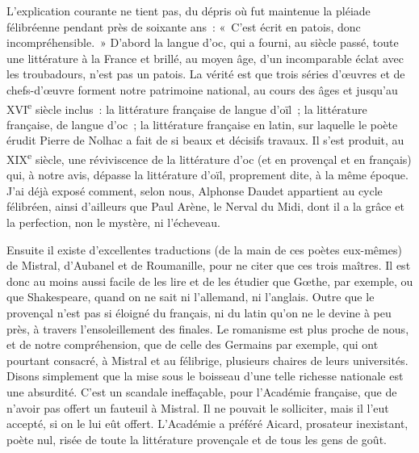 \documentclass[french,twoside]{book} %
\begin{document}
L’explication courante ne tient pas, du dépris où fut maintenue la pléiade félibréenne pendant près de soixante ans : « C’est écrit en patois, donc incompréhensible. » D’abord la langue d’oc, qui a fourni, au siècle passé, toute une littérature à la France et brillé, au moyen âge, d’un incomparable éclat avec les troubadours, n’est pas un patois. La vérité est que trois séries d’œuvres et de chefs-d’œuvre forment notre patrimoine national, au cours des âges et jusqu’au XVI\textsuperscript{e} siècle inclus : la littérature française de langue d’oïl ; la littérature française, de langue d’oc ; la littérature française en latin, sur laquelle le poète érudit Pierre de Nolhac a fait de si beaux et décisifs travaux. Il s’est produit, au XIX\textsuperscript{e} siècle, une réviviscence de la littérature d’oc (et en provençal et en français) qui, à notre avis, dépasse la littérature d’oïl, proprement dite, à la même époque. J’ai déjà exposé comment, selon nous, Alphonse Daudet appartient au cycle félibréen, ainsi d’ailleurs que Paul Arène, le Nerval du Midi, dont il a la grâce et la perfection, non le mystère, ni l’écheveau.\par
Ensuite il existe d’excellentes traductions (de la main de ces poètes eux-mêmes) de Mistral, d’Aubanel et de Roumanille, pour ne citer que ces trois maîtres. Il est donc au moins aussi facile de les lire et de les étudier que Gœthe, par exemple, ou que Shakespeare, quand on ne sait ni l’allemand, ni l’anglais. Outre que le provençal n’est pas si éloigné du français, ni du latin qu’on ne le devine à peu près, à travers l’ensoleillement des finales. Le romanisme est plus proche de nous, et de notre compréhension, que de celle des Germains par exemple, qui ont pourtant consacré, à Mistral et au félibrige, plusieurs chaires de leurs universités. Disons simplement que la mise sous le boisseau d’une telle richesse nationale est une absurdité. C’est un scandale ineffaçable, pour l’Académie française, que de n’avoir pas offert un fauteuil à Mistral. Il ne pouvait le solliciter, mais il l’eut accepté, si on le lui eût offert. L’Académie a préféré Aicard, prosateur inexistant, poète nul, risée de toute la littérature provençale et de tous les gens de goût.\par
\end{document}
